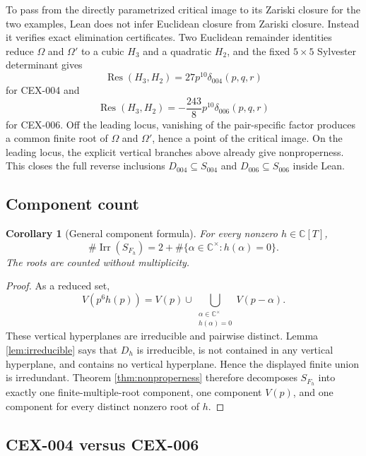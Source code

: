 \documentclass[11pt]{article}
\newtheorem{corollary}[theorem]{Corollary}
\newcommand{\C}{\mathbb{C}}
\newcommand{\Irr}{\operatorname{Irr}}
\begin{document}
To pass from the directly parametrized critical image to its Zariski closure
for the two examples, Lean does not infer Euclidean closure from Zariski
closure.  Instead it verifies exact elimination certificates.  Two Euclidean
remainder identities reduce $\Omega$ and $\Omega'$ to a cubic $H_3$ and a
quadratic $H_2$, and the fixed $5\times5$ Sylvester determinant gives
\[
 \operatorname{Res}(H_3,H_2)
 =27p^{10}\delta_{004}(p,q,r)
\]
for CEX-004 and
\[
 \operatorname{Res}(H_3,H_2)
 =-\frac{243}{8}p^{10}\delta_{006}(p,q,r)
\]
for CEX-006.  Off the leading locus, vanishing of the pair-specific factor
produces a common finite root of $\Omega$ and $\Omega'$, hence a point of the
critical image.  On the leading locus, the explicit vertical branches above
already give nonproperness.  This closes the full reverse inclusions
$D_{004}\subseteq S_{004}$ and $D_{006}\subseteq S_{006}$ inside Lean.

\subsection{Component count}

\begin{corollary}[General component formula]
\label{cor:count}
For every nonzero $h\in\C[T]$,
\begin{equation}
 \boxed{
 \#\Irr(S_{F_h})
 =2+\#\{\alpha\in\C^\times:h(\alpha)=0\}.}
 \label{eq:count}
\end{equation}
The roots are counted without multiplicity.
\end{corollary}

\begin{proof}
As a reduced set,
\[
 V(p^6h(p))
 =V(p)\cup
 \bigcup_{\substack{\alpha\in\C^\times\\h(\alpha)=0}}V(p-\alpha).
\]
These vertical hyperplanes are irreducible and pairwise distinct.  Lemma
\ref{lem:irreducible} says that $D_h$ is irreducible, is not contained in any
vertical hyperplane, and contains no vertical hyperplane.  Hence the displayed
finite union is irredundant.  Theorem \ref{thm:nonproperness} therefore
decomposes $S_{F_h}$ into exactly one finite-multiple-root component, one
component $V(p)$, and one component for every distinct nonzero root of $h$.
\end{proof}

\subsection{CEX-004 versus CEX-006}
\end{document}

